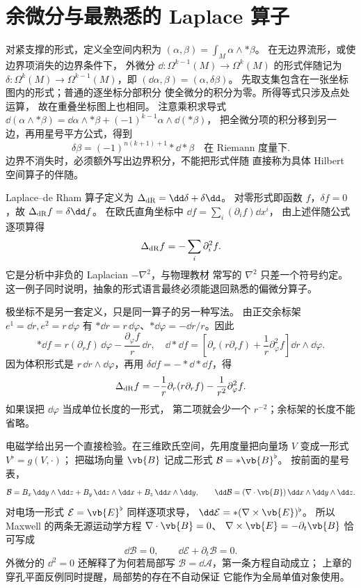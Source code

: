 \section{余微分与最熟悉的 Laplace 算子}

对紧支撑的形式，定义全空间内积为
\((\alpha,\beta)=\int_M\alpha\wedge *\beta\)。
在无边界流形，或使边界项消失的边界条件下，
外微分 \(\dd:\Omega^{k-1}(M)\to\Omega^k(M)\)
的形式伴随记为 \(\delta:\Omega^k(M)\to\Omega^{k-1}(M)\)，即
\((\dd\alpha,\beta)=(\alpha,\delta\beta)\)。
先取支集包含在一张坐标图内的形式；普通的逐坐标分部积分
使全微分的积分为零。所得等式只涉及点处运算，
故在重叠坐标图上也相同。
注意乘积求导式
\(\dd(\alpha\wedge *\beta)
=\dd\alpha\wedge *\beta+(-1)^{k-1}\alpha\wedge\dd(*\beta)\)，
把全微分项的积分移到另一边，再用星号平方公式，得到
\[
\delta\beta=(-1)^{n(k+1)+1}*\dd *\beta
\quad\text{在 Riemann 度量下}.
\]
边界不消失时，必须额外写出边界积分，不能把形式伴随
直接称为具体 Hilbert 空间算子的伴随。

Laplace--de Rham 算子定义为
\(\Delta_{\rm dR}=\dd\delta+\delta\dd\)。
对零形式即函数 \(f\)，\(\delta f=0\)，故
\(\Delta_{\rm dR}f=\delta\dd f\)。
在欧氏直角坐标中
\(\dd f=\sum_i(\partial_i f)\dd x^i\)，
由上述伴随公式逐项算得
\[
\Delta_{\rm dR}f=-\sum_i\partial_i^2f.
\]
它是分析中非负的 Laplacian \(-\nabla^2\)，与物理教材
常写的 \(\nabla^2\) 只差一个符号约定。
这一例子同时说明，抽象的形式语言最终必须能退回熟悉的偏微分算子。

极坐标不是另一套定义，只是同一算子的另一种写法。
由正交余标架 \(e^1=\dd r,e^2=r\,\dd\varphi\) 有
\(*\dd r=r\,\dd\varphi\)、\(*\dd\varphi=-\dd r/r\)。因此
\[
*\dd f=r(\partial_r f)\,\dd\varphi
-\frac{\partial_\varphi f}{r}\,\dd r,
\quad
\dd*\dd f=\left[\partial_r(r\partial_r f)
+\frac1r\partial_\varphi^2f\right]\dd r\wedge\dd\varphi.
\]
因为体积形式是 \(r\,\dd r\wedge\dd\varphi\)，再用
\(\delta\dd f=-*\dd*\dd f\)，得
\[
\Delta_{\rm dR}f
=-\frac1r\partial_r(r\partial_r f)
-\frac1{r^2}\partial_\varphi^2f.
\]
如果误把 \(\dd\varphi\) 当成单位长度的一形式，
第二项就会少一个 \(r^{-2}\)；余标架的长度不能省略。

电磁学给出另一个直接检验。在三维欧氏空间，先用度量把向量场
\(V\) 变成一形式 \(V^\flat=g(V,\cdot)\)；
把磁场向量 \(\vb{B}\) 记成二形式
\(\mathcal B=*\vb{B}^\flat\)。
按前面的星号表，
\[
\mathcal B=B_x\,\dd y\wedge\dd z
+B_y\,\dd z\wedge\dd x+B_z\,\dd x\wedge\dd y,
\qquad
\dd\mathcal B=(\nabla\cdot\vb{B})\,\dd x\wedge\dd y\wedge\dd z.
\]
对电场一形式 \(\mathcal E=\vb{E}^\flat\) 同样逐项求导，
\(\dd\mathcal E=*(\nabla\times\vb{E})^\flat\)。
所以 Maxwell 的两条无源运动学方程
\(\nabla\cdot\vb{B}=0\)、
\(\nabla\times\vb{E}=-\partial_t\vb{B}\)
恰可写成
\[
\dd\mathcal B=0,
\qquad
\dd\mathcal E+\partial_t\mathcal B=0.
\]
外微分的 \(\dd^2=0\) 还解释了为何若局部写
\(\mathcal B=\dd\mathcal A\)，第一条方程自动成立；
上章的穿孔平面反例同时提醒，局部势的存在不自动保证
它能作为全局单值对象使用。



